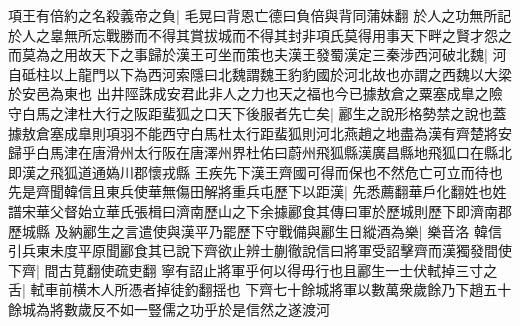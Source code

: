 項王有倍約之名殺義帝之負|{
	毛晃曰背恩亡德曰負倍與背同蒲妹翻}
於人之功無所記於人之辠無所忘戰勝而不得其賞拔城而不得其封非項氏莫得用事天下畔之賢才怨之而莫為之用故天下之事歸於漢王可坐而策也夫漢王發蜀漢定三秦涉西河破北魏|{
	河自砥柱以上龍門以下為西河索隱曰北魏謂魏王豹豹國於河北故也亦謂之西魏以大梁於安邑為東也}
出井陘誅成安君此非人之力也天之福也今已據敖倉之粟塞成臯之險守白馬之津杜大行之阪距蜚狐之口天下後服者先亡矣|{
	酈生之說形格勢禁之說也蓋據敖倉塞成臯則項羽不能西守白馬杜太行距蜚狐則河北燕趙之地盡為漢有齊楚將安歸乎白馬津在唐滑州太行阪在唐澤州界杜佑曰蔚州飛狐縣漢廣昌縣地飛狐口在縣北即漢之飛狐道通媯川郡懷戎縣}
王疾先下漢王齊國可得而保也不然危亡可立而待也先是齊聞韓信且東兵使華無傷田解將重兵屯歷下以距漢|{
	先悉薦翻華戶化翻姓也姓譜宋華父督始立華氏張楫曰濟南歷山之下余據酈食其傳曰軍於歷城則歷下即濟南郡歷城縣}
及納酈生之言遣使與漢平乃罷歷下守戰備與酈生日縱酒為樂|{
	樂音洛}
韓信引兵東未度平原聞酈食其已說下齊欲止辨士蒯徹說信曰將軍受詔擊齊而漢獨發間使下齊|{
	間古莧翻使疏吏翻}
寧有詔止將軍乎何以得毋行也且酈生一士伏軾掉三寸之舌|{
	軾車前横木人所憑者掉徒釣翻揺也}
下齊七十餘城將軍以數萬衆歲餘乃下趙五十餘城為將數歲反不如一豎儒之功乎於是信然之遂渡河

